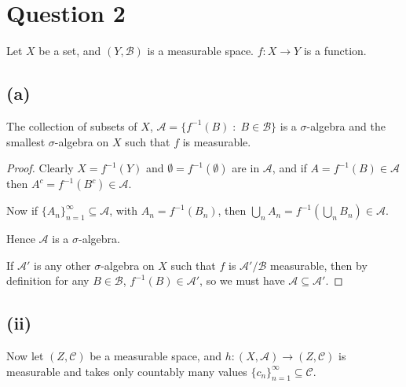 \documentclass{unswmaths}
\begin{document}
\section*{Question 2}
Let $X$ be a set, and $(Y,\mathcal{B})$ is a measurable space. $f:X\rightarrow Y$
is a function.
\subsection*{(a)}
\begin{lemma}
    The collection of subsets of $X$, $\mathcal{A} = \{f^{-1}(B)\;:\;B \in \mathcal{B}\}$
    is a $\sigma$-algebra and the smallest $\sigma$-algebra on $X$
    such that $f$ is measurable.
\end{lemma}
\begin{proof}
    Clearly $X = f^{-1}(Y)$ and $\emptyset = f^{-1}(\emptyset)$ are in $\mathcal{A}$,
    and if $A = f^{-1}(B) \in \mathcal{A}$ then $A^c = f^{-1}(B^c) \in \mathcal{A}$.
    
    
    Now if $\{A_n\}_{n=1}^{\infty} \subseteq \mathcal{A}$, with $A_n = f^{-1}(B_n)$,
    then $\bigcup_n A_n = f^{-1}(\bigcup_n B_n) \in \mathcal{A}$.
    
    Hence $\mathcal{A}$ is a $\sigma$-algebra.
    
    If $\mathcal{A}'$ is any other $\sigma$-algebra on $X$ such that $f$
    is $\mathcal{A}'/\mathcal{B}$ measurable, then by definition
    for any $B \in \mathcal{B}$, $f^{-1}(B) \in \mathcal{A}'$, so    
    we
    must have $\mathcal{A} \subseteq \mathcal{A}'$.
        
    
\end{proof}
\subsection*{(ii)}
Now let $(Z,\mathcal{C})$
be a measurable space, and $h:(X,\mathcal{A})\rightarrow (Z,\mathcal{C})$
is measurable and takes only countably many values $\{c_n\}_{n=1}^\infty \subseteq \mathcal{C}$.
\end{document}
